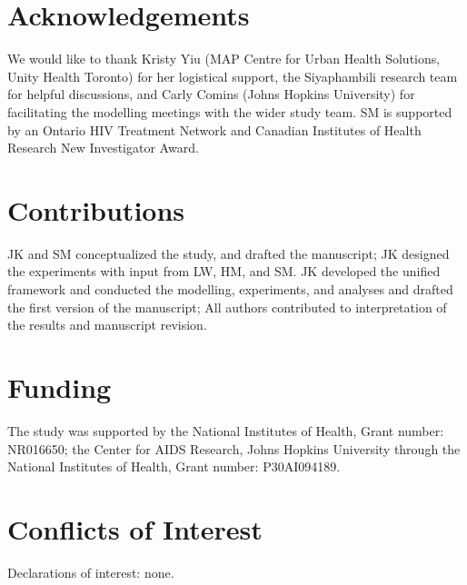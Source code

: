 \section*{Acknowledgements}
We would like to thank
Kristy Yiu (MAP Centre for Urban Health Solutions, Unity Health Toronto) for her logistical support,
the Siyaphambili research team for helpful discussions,
and Carly Comins (Johns Hopkins University)
for facilitating the modelling meetings with the wider study team.
SM is supported by an Ontario HIV Treatment Network and
Canadian Institutes of Health Research New Investigator Award.
\section*{Contributions}
JK and SM conceptualized the study, and drafted the manuscript;
JK designed the experiments with input from LW, HM, and SM.
JK developed the unified framework and conducted the modelling, experiments,
and analyses and drafted the first version of the manuscript; 
All authors contributed to interpretation of the results and manuscript revision.
\section*{Funding}
The study was supported by
the National Institutes of Health, Grant number: NR016650;
the Center for AIDS Research, Johns Hopkins University
  through the National Institutes of Health, Grant number: P30AI094189.
\section*{Conflicts of Interest}
Declarations of interest: none.
